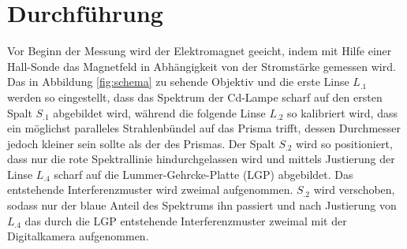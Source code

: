 \section{Durchführung}
\label{sec:Durchführung}
Vor Beginn der Messung wird der Elektromagnet geeicht, indem mit Hilfe einer Hall-Sonde das Magnetfeld in Abhängigkeit von der Stromstärke gemessen wird. Das in Abbildung \ref{fig:schema} zu sehende Objektiv und die erste Linse $L_.1$ werden so eingestellt, dass das Spektrum der Cd-Lampe scharf auf den ersten Spalt $S_.1$ abgebildet wird, während die folgende Linse $L_.2$ so kalibriert wird, dass ein möglichst paralleles Strahlenbündel auf das Prisma trifft, dessen Durchmesser jedoch kleiner sein sollte als der des Prismas.
Der Spalt $S_.2$ wird so positioniert, dass nur die rote Spektrallinie hindurchgelassen wird und mittels Justierung der Linse $L_.4$ scharf auf die Lummer-Gehrcke-Platte (LGP) abgebildet. Das entstehende
Interferenzmuster wird zweimal aufgenommen.
$S_.2$ wird verschoben, sodass nur der blaue Anteil des Spektrums ihn passiert und nach Justierung von $L_.4$ das durch die LGP entstehende Interferenzmuster zweimal mit der Digitalkamera aufgenommen.

